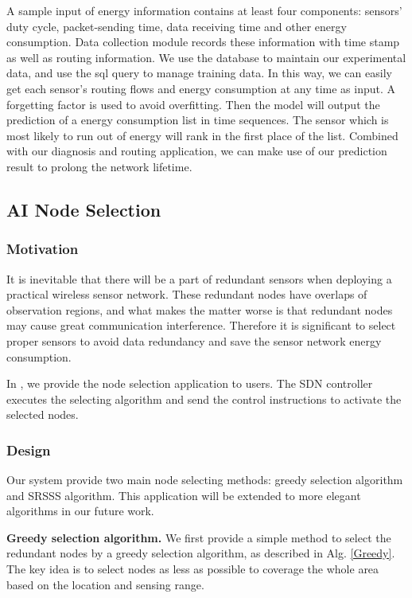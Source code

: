 A sample input of energy information contains at least four components: sensors'
duty cycle, packet-sending time, data receiving time and other energy
consumption. Data collection module records these information with time stamp
as well as routing information. We use the database to maintain our experimental data,
and use the sql query to manage training data. In this way, we can easily
get each sensor's routing flows and energy consumption at any time as input. A forgetting factor
is used to avoid overfitting. Then the model will output the prediction of a energy consumption list in time
sequences. The sensor which is most likely to run out of energy will rank in the first place of the list. 
Combined with our diagnosis and routing application, we can make use of our prediction result to prolong the network
lifetime.





\subsection{AI Node Selection}

\subsubsection{Motivation}

It is inevitable that there will be a part of redundant sensors when deploying a 
practical wireless sensor network. These redundant nodes have overlaps of
observation regions, and what makes the matter worse is that redundant nodes
may cause great communication interference. Therefore it is significant to select 
proper sensors to avoid data redundancy and save the sensor network energy consumption.

In {\sdn}, we provide the node selection application to users. The SDN controller executes the 
selecting algorithm and send the control instructions to activate the selected nodes.

\subsubsection{Design} Our {\sdn} system provide two main node selecting methods: 
greedy selection algorithm and SRSSS algorithm. This application will be extended to more elegant 
algorithms in our future work. 

\textbf{Greedy selection algorithm.} We first provide a simple method to select 
the redundant nodes by a greedy selection algorithm, as described in Alg. \ref{Greedy}. 
The key idea is to select nodes as less as possible to coverage the whole area
 based on the location and sensing range. 
 
